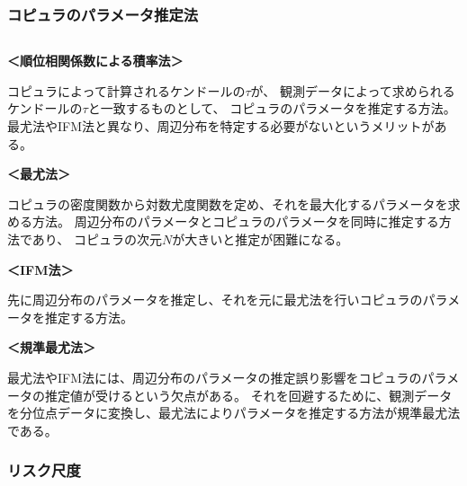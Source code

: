 \subsubsection{コピュラのパラメータ推定法}

\begin{sol}
$ $

\textbf{＜順位相関係数による積率法＞}

コピュラによって計算されるケンドールの$\tau$が、
観測データによって求められるケンドールの$\tau$と一致するものとして、
コピュラのパラメータを推定する方法。
最尤法やIFM法と異なり、周辺分布を特定する必要がないというメリットがある。


\textbf{＜最尤法＞}

コピュラの密度関数から対数尤度関数を定め、それを最大化するパラメータを求める方法。
周辺分布のパラメータとコピュラのパラメータを同時に推定する方法であり、
コピュラの次元$N$が大きいと推定が困難になる。

\textbf{＜IFM法＞}

先に周辺分布のパラメータを推定し、それを元に最尤法を行いコピュラのパラメータを推定する方法。

\textbf{＜規準最尤法＞}

最尤法やIFM法には、周辺分布のパラメータの推定誤り影響をコピュラのパラメータの推定値が受けるという欠点がある。
それを回避するために、観測データを分位点データに変換し、最尤法によりパラメータを推定する方法が規準最尤法である。

\end{sol}

\newpage

\subsubsection{リスク尺度}

